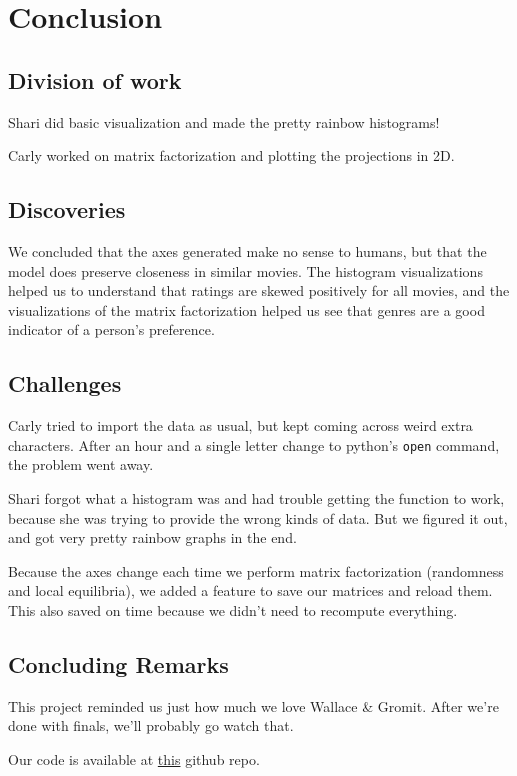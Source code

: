 \section{Conclusion}
\subsection{Division of work}
Shari did basic visualization and made the pretty rainbow histograms!

Carly worked on matrix factorization and plotting the projections in 2D.

\subsection{Discoveries}
We concluded that the axes generated make no sense to humans, but that the model does preserve closeness in similar movies. The histogram visualizations helped us to understand that ratings are skewed positively for all movies, and the visualizations of the matrix factorization helped us see that genres are a good indicator of a person's preference.

\subsection{Challenges}
Carly tried to import the data as usual, but kept coming across weird extra characters. After an hour and a single letter change to python's {\tt open} command, the problem went away.

Shari forgot what a histogram was and had trouble getting the function to work, because she was trying to provide the wrong kinds of data. But we figured it out, and got very pretty rainbow graphs in the end.

Because the axes change each time we perform matrix factorization (randomness and local equilibria), we added a feature to save our matrices and reload them. This also saved on time because we didn't need to recompute everything.

\subsection{Concluding Remarks}
This project reminded us just how much we love Wallace \& Gromit. After we're done with finals, we'll probably go watch that.

Our code is available at \href{https://github.com/carlyrobison/MovieLensVis/}{this} github repo.







